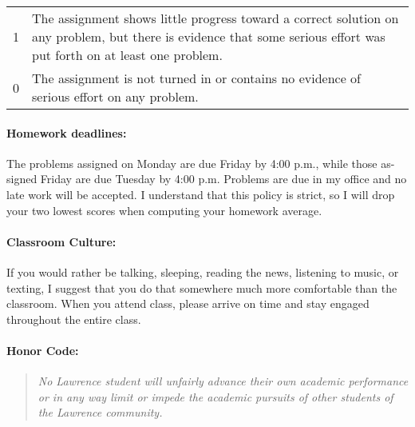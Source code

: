 \documentclass[11pt,]{article}
\begin{document}
\begin{longtable}[]{@{}ll@{}}
\begin{minipage}[t]{0.08\columnwidth}
1
\strut\end{minipage} &
\begin{minipage}[t]{0.86\columnwidth}\raggedright\strut
The assignment shows little progress toward a correct solution on any
problem, but there is evidence that some serious effort was put forth on
at least one problem.
\strut\end{minipage}\tabularnewline
\begin{minipage}[t]{0.08\columnwidth}\raggedright\strut
0
\strut\end{minipage} &
\begin{minipage}[t]{0.86\columnwidth}\raggedright\strut
The assignment is not turned in or contains no evidence of serious
effort on any problem.
\strut\end{minipage}\tabularnewline
\bottomrule
\end{longtable}

\paragraph{Homework deadlines:}\label{homework-deadlines}

The problems assigned on Monday are due Friday by 4:00 p.m., while those
as- signed Friday are due Tuesday by 4:00 p.m. Problems are due in my
office and no late work will be accepted. I understand that this policy
is strict, so I will drop your two lowest scores when computing your
homework average.

\paragraph{Classroom Culture:}\label{classroom-culture}

If you would rather be talking, sleeping, reading the news, listening to
music, or texting, I suggest that you do that somewhere much more
comfortable than the classroom. When you attend class, please arrive on
time and stay engaged throughout the entire class.

\paragraph{Honor Code:}\label{honor-code}

\begin{quote}
\emph{No Lawrence student will unfairly advance their own academic
performance or in any way limit or impede the academic pursuits of other
students of the Lawrence community.}
\end{quote}
\end{document}

